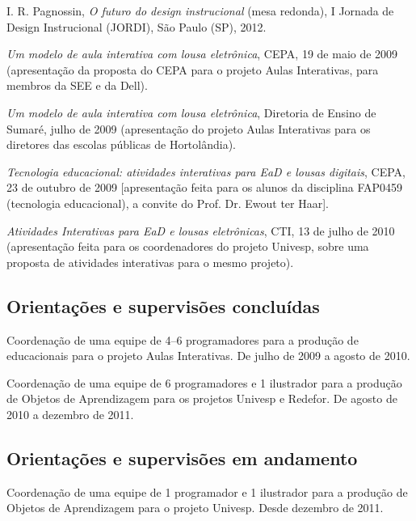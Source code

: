 \begin{compactitem}
  \item I. R. Pagnossin, \textsl{O futuro do design instrucional} (mesa redonda), I Jornada de Design Instrucional (JORDI), São Paulo (SP), 2012.
  \item \textsl{Um modelo de aula interativa com lousa eletrônica}, CEPA, 19 de maio de 2009 (apresentação da proposta do CEPA para o projeto Aulas Interativas, para membros da SEE e da Dell).
  \item \textsl{Um modelo de aula interativa com lousa eletrônica}, Diretoria de Ensino de Sumaré, julho de 2009 (apresentação do projeto Aulas Interativas para os diretores das escolas públicas de Hortolândia).
  \item \textsl{Tecnologia educacional: atividades interativas para EaD e lousas digitais}, CEPA, 23 de outubro de 2009 [apresentação feita para os alunos da disciplina FAP0459 (tecnologia educacional), a convite do Prof. Dr. Ewout ter Haar].
  \item \textsl{Atividades Interativas para EaD e lousas eletrônicas}, CTI, 13 de julho de 2010 (apresentação feita para os coordenadores do projeto Univesp, sobre uma proposta de atividades interativas para o mesmo projeto).
\end{compactitem}

\subsection{Orientações e supervisões concluídas}

\begin{compactitem}
  \item Coordenação de uma equipe de 4--6 programadores para a produção de  educacionais para o projeto Aulas Interativas. De julho de 2009 a agosto de 2010.
  \item Coordenação de uma equipe de 6 programadores e 1 ilustrador para a produção de Objetos de Aprendizagem para os projetos Univesp e Redefor. De agosto de 2010 a dezembro de 2011.
\end{compactitem}

\subsection{Orientações e supervisões em andamento}

\begin{compactitem}
  \item Coordenação de uma equipe de 1 programador e 1 ilustrador para a produção de Objetos de Aprendizagem para o projeto Univesp. Desde dezembro de 2011.
\end{compactitem}


